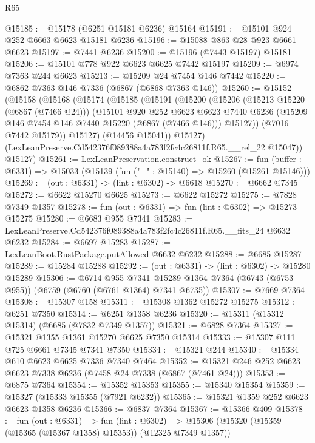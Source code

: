 \begin{lexlean}{R65}
\begin{coremodule}
{@15185 := @15178 (@6251 @15181 @6236) @15164
@15191 := @15101 @924 @252 @6663 @6623 @15181 @6236
@15196 := @15088 @863 @28 @923 @6661 @6623
@15197 := @7441 @6236
@15200 := @15196 (@7443 @15197) @15181
@15206 := @15101 @778 @922 @6623 @6625 @7442 @15197
@15209 := @6974 @7363 @244 @6623
@15213 := @15209 @24 @7454 @146 @7442
@15220 := @6862 @7363 @146 @7336 (@6867 (@6868 @7363 @146))
@15260 := @15152
    (@15158
      (@15168
        (@15174
          (@15185
            (@15191
              (@15200
                (@15206
                  (@15213 @15220 (@6867 (@7466 @24)))
                  (@15101
                    @920
                    @252
                    @6623
                    @6623
                    @7440
                    @6236
                    (@15209 @146 @7454 @146 @7440 @15220 (@6867 (@7466 @146)))
                    @15127))
                (@7016 @7442 @15179))
              @15127)
            (@14456 @15041))
          @15127)
        (LexLeanPreserve.Cd542376f089388a4a783f2fc4c26811f.R65.__rel_22 @15047))
      @15127)
@15261 := LexLeanPreservation.construct_ok
@15267 := fun (buffer : @6331) => @15033 (@15139 (fun ("_" : @15140) => @15260 (@15261 @15146)))
@15269 := (out : @6331) -> (lint : @6302) -> @6618
@15270 := @6662 @7345
@15272 := @6622 @15270 @6625
@15273 := @6622 @15272
@15275 := @7828 @7349 @1357
@15278 := fun (out : @6331) => fun (lint : @6302) => @15273 @15275
@15280 := @6683 @955 @7341
@15283 := LexLeanPreserve.Cd542376f089388a4a783f2fc4c26811f.R65.__fits_24 @6632 @6232
@15284 := @6697 @15283
@15287 := LexLeanBoot.RustPackage.putAllowed @6632 @6232
@15288 := @6685 @15287
@15289 := @15284 @15288
@15292 := (out : @6331) -> (lint : @6302) -> @15280 @15289
@15306 := @6714
    @955
    @7341
    @15289
    @1364
    @7364
    (@6743 (@6753 @955))
    (@6759 (@6760 (@6761 @1364) @7341 @6735))
@15307 := @7669 @7364
@15308 := @15307 @158
@15311 := @15308 @1362 @15272 @15275
@15312 := @6251 @7350
@15314 := @6251 @1358 @6236
@15320 := @15311 (@15312 @15314) (@6685 (@7832 @7349 @1357))
@15321 := @6828 @7364
@15327 := @15321 @1355 @1361 @15270 @6625 @7350 @15314
@15333 := @15307 @111 @725 @6661 @7345 @7341 @7350
@15334 := @15321 @244
@15340 := @15334 @610 @6623 @6625 @7336 @7340 @7464
@15352 := @15321 @246 @252 @6623 @6623 @7338 @6236 (@7458 @24 @7338 (@6867 (@7461 @24)))
@15353 := @6875 @7364
@15354 := @15352 @15353
@15355 := @15340 @15354
@15359 := @15327 (@15333 @15355 (@7921 @6232))
@15365 := @15321 @1359 @252 @6623 @6623 @1358 @6236
@15366 := @6837 @7364
@15367 := @15366 @409
@15378 := fun (out : @6331) =>
  fun (lint : @6302) => @15306 (@15320 (@15359 (@15365 (@15367 @1358) @15353)) (@12325 @7349 @1357))
}
\end{coremodule}
\end{lexlean}
